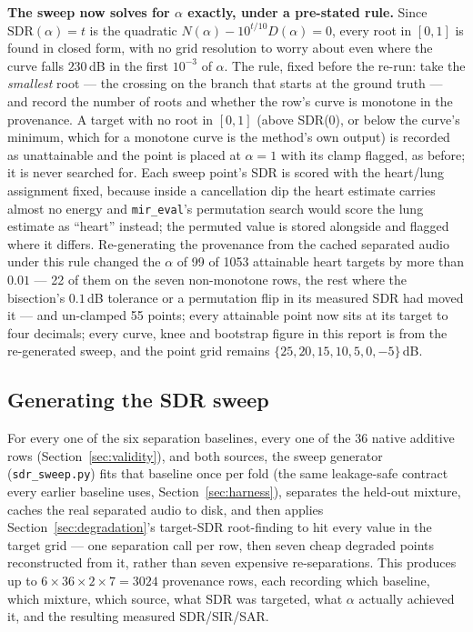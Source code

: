 \documentclass[11pt]{article}
\begin{document}
\textbf{The sweep now solves for $\alpha$ exactly, under a pre-stated
rule.} Since $\text{SDR}(\alpha) = t$ is the quadratic
$N(\alpha) - 10^{t/10} D(\alpha) = 0$, every root in $[0,1]$ is found in
closed form, with no grid resolution to worry about even where the curve
falls $230$\,dB in the first $10^{-3}$ of $\alpha$. The rule, fixed before
the re-run: take the \emph{smallest} root --- the crossing on the branch
that starts at the ground truth --- and record the number of roots and
whether the row's curve is monotone in the provenance. A target with no
root in $[0,1]$ (above SDR(0), or below the curve's minimum, which for a
monotone curve is the method's own output) is recorded as unattainable and
the point is placed at $\alpha{=}1$ with its clamp flagged, as before; it
is never searched for. Each sweep point's SDR is scored with the
heart/lung assignment fixed, because inside a cancellation dip the heart
estimate carries almost no energy and \texttt{mir\_eval}'s permutation
search would score the lung estimate as ``heart'' instead; the permuted
value is stored alongside and flagged where it differs. Re-generating the
provenance from the cached separated audio under this rule changed the
$\alpha$ of 99 of 1053 attainable heart targets by more than $0.01$ --- 22 of
them on the seven non-monotone rows, the rest where the bisection's
$0.1$\,dB tolerance or a permutation flip in its measured SDR had moved it
--- and un-clamped 55 points; every attainable point now sits at its
target to four decimals;
every curve, knee and bootstrap figure in this report is from the
re-generated sweep, and the point grid remains
$\{25, 20, 15, 10, 5, 0, -5\}$\,dB.

\subsection{Generating the SDR sweep}
\label{sec:sweepgen}

For every one of the six separation baselines, every one of the 36 native
additive rows (Section~\ref{sec:validity}), and both sources, the sweep
generator (\texttt{sdr\_sweep.py}) fits that baseline once per fold (the
same leakage-safe contract every earlier baseline uses,
Section~\ref{sec:harness}), separates the held-out mixture, caches the
real separated audio to disk, and then applies Section~\ref{sec:degradation}'s
target-SDR root-finding to hit every value in the target grid --- one
separation call per row, then seven cheap degraded points reconstructed
from it, rather than seven expensive re-separations. This produces up to
$6 \times 36 \times 2 \times 7 = 3024$ provenance rows, each recording
which baseline, which mixture, which source, what SDR was targeted, what
$\alpha$ actually achieved it, and the resulting measured SDR/SIR/SAR.
\end{document}
